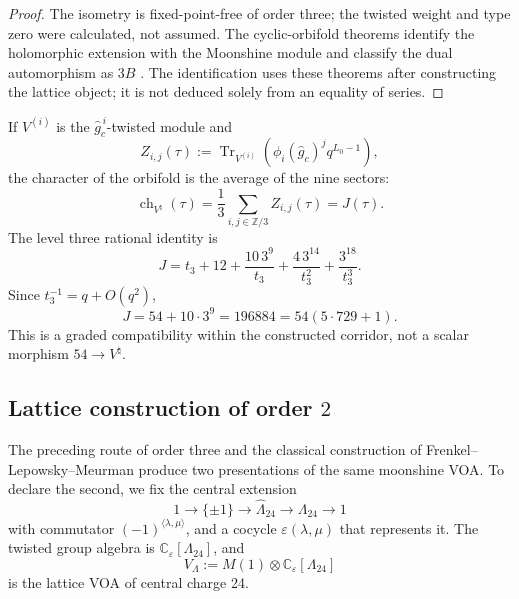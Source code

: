 \begin{proof}
The isometry is fixed-point-free of order three; the twisted weight and type zero were calculated, not assumed. The cyclic-orbifold theorems identify the holomorphic extension with the Moonshine module and classify the dual automorphism as \(3B\) \cite{ChenLamShimakura2016,AbeLamYamada2017,Carnahan2017}. The identification uses these theorems after constructing the lattice object; it is not deduced solely from an equality of series.
\end{proof}

If \(V^{(i)}\) is the \(\widehat g_c^{\,i}\)-twisted module and
\[
 Z_{i,j}(\tau):=
 \operatorname{Tr}_{V^{(i)}}\!
 \left(
 \phi_i(\widehat g_c)^j q^{L_0-1}
 \right),
\]
the character of the orbifold is the average of the nine sectors:
\begin{equation}
 \operatorname{ch}_{V^\natural}(\tau)
 =\frac13\sum_{i,j\in\mathbb Z/3}Z_{i,j}(\tau)
 =J(\tau).
 \label{p12-83-c20-s8:eq:promedio-nueve-sectores-u031}
\end{equation}
The level three rational identity is
\begin{equation}
 J
 =t_3+12+\frac{10\,3^9}{t_3}
 +\frac{4\,3^{14}}{t_3^2}
 +\frac{3^{18}}{t_3^3}.
 \label{p12-83-c20-s8:eq:j-desde-t3-u031}
\end{equation}
Since \(t_3^{-1}=q+O(q^2)\),
\begin{equation}
 [q]J=54+10\cdot3^9=196884
 =54(5\cdot729+1).
 \label{p12-83-c20-s8:eq:coeficiente-196884-u031}
\end{equation}
This is a graded compatibility within the constructed corridor, not a
scalar morphism \(54\to V^\natural\).

\subsection{Lattice construction of order \(2\)}

The preceding route of order three and the classical construction of
Frenkel--Lepowsky--Meurman produce two presentations of the same moonshine VOA.
To declare the second, we fix the central extension
\begin{equation}
 1\longrightarrow\{\pm1\}
 \longrightarrow\widehat\Lambda_{24}
 \longrightarrow\Lambda_{24}
 \longrightarrow1
 \label{p12-83-c20-s8:eq:extension-central-leech-u031}
\end{equation}
with commutator
\((-1)^{\langle\lambda,\mu\rangle}\), and a cocycle
\(\varepsilon(\lambda,\mu)\) that represents it. The twisted group algebra is \(\mathbb C_\varepsilon[\Lambda_{24}]\), and
\begin{equation}
 V_\Lambda
 :=M(1)\otimes\mathbb C_\varepsilon[\Lambda_{24}]
 \label{p12-83-c20-s8:eq:voa-reticular-leech-u031}
\end{equation}
is the lattice VOA of central charge 24.

